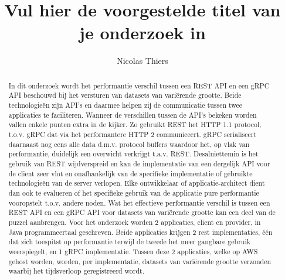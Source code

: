 \documentclass{hogent-article}
\title{Vul hier de voorgestelde titel van je onderzoek in}
\author{Nicolas Thiers}
\begin{document}
\begin{abstract}
  In dit onderzoek wordt het performantie verschil tussen een REST API en een gRPC API beschouwd bij het versturen van datasets van variërende grootte.
  Beide technologieën zijn API's en daarmee helpen zij de communicatie tussen twee applicaties te faciliteren.
  Wanneer de verschillen tussen de API's bekeken worden vallen enkele punten extra in de kijker.
  Zo gebruikt REST het HTTP 1.1 protocol, t.o.v. gRPC dat via het performantere HTTP 2 communiceert.
  gRPC serialiseert daarnaast nog eens alle data d.m.v. protocol buffers waardoor het, op vlak van performantie, duidelijk een overwicht verkrijgt t.a.v. REST.
  Desalniettemin is het gebruik van REST wijdverspreid en kan de implementatie van een dergelijk API voor de client zeer vlot en onafhankelijk van de specifieke
  implementatie of gebruikte technologieën van de server verlopen. Elke ontwikkelaar of applicatie-architect dient dan ook te evalueren of het specifieke gebruik
  van de applicatie pure performantie vooropstelt t.o.v. andere noden. Wat het effectieve performantie verschil is tussen een REST API en een gRPC API voor
  datasets van variërende grootte kan een deel van de puzzel aanbrengen.
  Voor het onderzoek worden 2 applicaties, client en provider, in Java programmeertaal geschreven.
  Beide applicaties krijgen 2 rest implementaties, één dat zich toespitst op performantie terwijl de tweede het meer gangbare gebruik weerspiegelt,
  en 1 gRPC implementatie. Tussen deze 2 applicaties, welke op AWS gehost worden, worden, per implementatie, datasets van variërende grootte
  verzonden waarbij het tijdsverloop geregistreerd wordt.
\end{abstract}

\tableofcontents



\printbibliography[heading=bibintoc]
\end{document}
